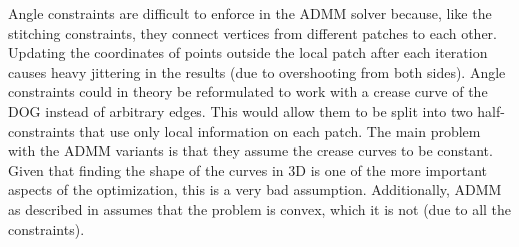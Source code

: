 \documentclass[a4paper,twoside,12pt,nochapterprefix]{scrbook}
\begin{document}
Angle constraints are difficult to enforce in the ADMM solver because, like the stitching constraints, they connect vertices from different patches to each other. Updating the coordinates of points outside the local patch after each iteration causes heavy jittering in the results (due to overshooting from both sides). Angle constraints could in theory be reformulated to work with a crease curve of the DOG instead of arbitrary edges. This would allow them to be split into two half-constraints that use only local information on each patch.\newline
The main problem with the ADMM variants is that they assume the crease curves to be constant. Given that finding the shape of the curves in 3D is one of the more important aspects of the optimization, this is a very bad assumption. Additionally, ADMM as described in \cite{Deng2017ParallelMA} assumes that the problem  is convex, which it is not (due to all the constraints).\newline

\end{document}
